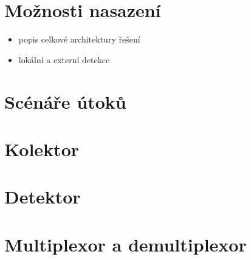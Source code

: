  \section{Možnosti nasazení}
    \begin{itemize}
      \item popis celkové architektury řešení
      \item lokální a externí detekce
    \end{itemize}
 \section{Scénáře útoků}
 \section{Kolektor}
 \section{Detektor}
 \section{Multiplexor a demultiplexor}
